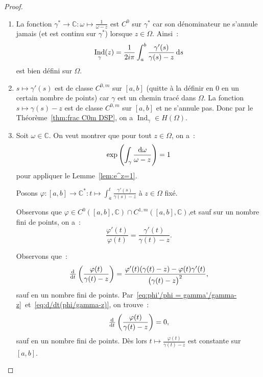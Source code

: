 \documentclass{report}
\theoremstyle{definition}
\theoremstyle{remark}
\numberwithin{equation}{section}
\newcommand{\C}{\mathbb C}
\DeclareMathOperator{\Ind}{Ind}
\begin{document}
			\begin{proof}~
			\begin{enumerate}
				\item La fonction $\gamma^* \to \C : \omega \mapsto \frac 1{\omega - z}$ est $C^0$ sur $\gamma^*$ car son dénominateur ne s'annule jamais (et est continu
				sur $\gamma^*$) lorsque $z \in \Omega$. Ainsi~:
				\begin{equation}
					\Ind_\gamma(z) = \frac 1{2i\pi}\int_a^b\frac {\gamma'(s)}{\gamma(s)-z}\dif s
				\end{equation}
				est bien défini sur $\Omega$.
				\item $s \mapsto \gamma'(s)$ est de classe $C^{0,m}$ sur $[a, b]$ (quitte à la définir en $0$ en un certain nombre de points) car $\gamma$ est un chemin
				tracé dans $\Omega$. La fonction $s \mapsto \gamma(s) - z$ est de classe $C^{0,m}$ sur $[a, b]$ et ne s'annule pas. Donc par le
				Théorème~\ref{thm:frac C0m DSP}, on a $\Ind_\gamma \in H(\Omega)$.
				\item Soit $\omega \in \C$. On veut montrer que pour tout $z \in \Omega$, on a~:
				\begin{equation}
					\exp\left(\int_\gamma\frac {\dif \omega}{\omega-z}\right) = 1
				\end{equation}
				pour appliquer le Lemme~\ref{lem:e^z=1}.

				Posons $\varphi : [a, b] \to \C^* : t \mapsto \int_a^t\frac {\gamma'(s)}{\gamma(s) - z}$ à $z \in \Omega$ fixé.

				Observons que $\varphi \in C^0([a, b], \C) \cap C^{1,m}([a, b], \C)$,et sauf sur un nombre fini de points, on a~:
				\begin{equation}\label{eq:phi'/phi = gamma'/gamma-z}
					\frac {\varphi'(t)}{\varphi(t)} = \frac {\gamma'(t)}{\gamma(t) - z}.
				\end{equation}

				Observons que~:
				\begin{equation}\label{eq:d/dt(phi/gamma-z)}
					\od {}t\left(\frac {\varphi(t)}{\gamma(t) - z}\right) = \frac {\varphi'(t)(\gamma(t)-z) - \varphi(t)\gamma'(t)}{\left(\gamma(t) - z\right)^2},
				\end{equation}
				sauf en un nombre fini de points. Par~\eqref{eq:phi'/phi = gamma'/gamma-z}~et~\eqref{eq:d/dt(phi/gamma-z)}, on trouve~:
				\begin{equation}
					\od{}t\left(\frac {\varphi(t)}{\gamma(t)-z}\right) = 0,
				\end{equation}
				sauf en un nombre fini de points. Dès lors $t \mapsto \frac {\varphi(t)}{\gamma(t) - z}$ est constante sur $[a, b]$.


\end{enumerate}
\end{proof}
\end{document}
